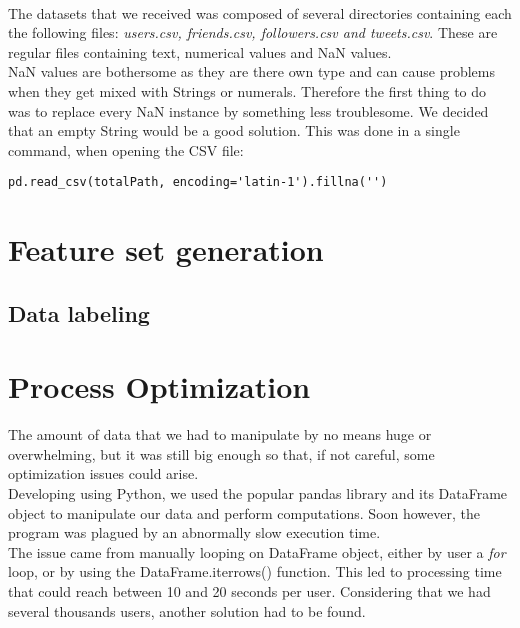 \documentclass[a4paper,11pt]{article}
\begin{document}
\paragraph{}
The datasets that we received was composed of several directories containing each the following files: \textit{users.csv, friends.csv, followers.csv and tweets.csv}. These are regular files containing text, numerical values and NaN values.\\

NaN values are bothersome as they are there own type and can cause problems when they get mixed with Strings or numerals. Therefore the first thing to do was to replace every NaN instance by something less troublesome. We decided that an empty String would be a good solution. This was done in a single command, when opening the CSV file:

\begin{lstlisting}
pd.read_csv(totalPath, encoding='latin-1').fillna('')
\end{lstlisting}

\section{Feature set generation}

\subsection{Data labeling}

\section{Process Optimization}
The amount of data that we had to manipulate by no means huge or overwhelming, but it was still big enough so that, if not careful, some optimization issues could arise.\\

Developing using Python, we used the popular pandas library and its DataFrame object to manipulate our data and perform computations. Soon however, the program was plagued by an abnormally slow execution time.\\

The issue came from manually looping on DataFrame object, either by user a \textit{for} loop, or by using the DataFrame.iterrows() function. This led to processing time that could reach between 10 and 20 seconds per user. Considering that we had several thousands users, another solution had to be found.
\end{document}
